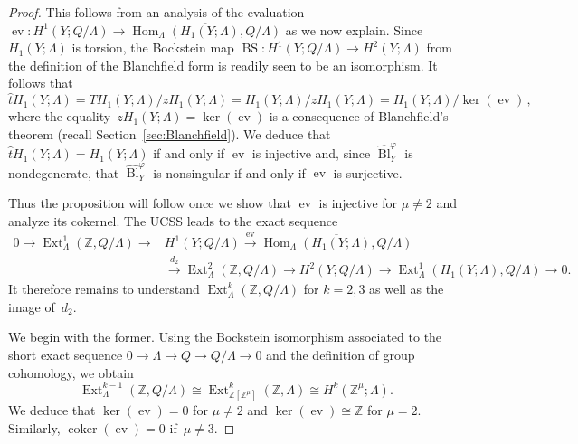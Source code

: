 \documentclass[10.9pt,a4paper]{amsart}
\theoremstyle{definition}
\theoremstyle{remark}
\newcommand{\Z}{\mathbb{Z}}
\newcommand{\Bl}{\operatorname{Bl}}
\newcommand{\ev}{\operatorname{ev}}
\newcommand{\BS}{\operatorname{BS}}
\newcommand{\coker}{\operatorname{coker}}
\newcommand{\Ext}{\operatorname{Ext}}
\newcommand{\Hom}{\operatorname{Hom}}
\begin{document}
\begin{proof}
This follows from an analysis of the evaluation~$\ev \colon H^1(Y; Q/\Lambda)\to \overline{\Hom_\Lambda(H_1(Y; \Lambda),Q/\Lambda)}$ as we now explain.
Since~$H_1(Y;\Lambda)$ is torsion, the Bockstein map $\BS \colon H^1(Y;Q/\Lambda) \to H^2(Y;\Lambda)$ from the definition of the Blanchfield form is readily seen to be an isomorphism.
It follows that 
$$\hat{t} H_1(Y;\Lambda)=TH_1(Y;\Lambda)/zH_1(Y;\Lambda)=H_1(Y;\Lambda)/zH_1(Y;\Lambda)=H_1(Y;\Lambda)/\ker(\ev)\,,$$
where the equality~$zH_1(Y;\Lambda)=\ker(\ev)$ is a consequence of Blanchfield's theorem (recall Section~\ref{sec:Blanchfield}).
We deduce that $\hat{t} H_1(Y;\Lambda)=H_1(Y;\Lambda)$ if and only if $\ev$ is injective and, since $\hat{\Bl}^{\varphi}_Y$ is nondegenerate,  that $\hat{\Bl}^{\varphi}_Y$ is nonsingular if and only if $\ev$ is surjective.

Thus the proposition will follow once we show that $\ev$ is injective for $\mu \neq 2$ and analyze its cokernel.
The UCSS leads to the exact sequence
\begin{equation}
\label{eq:UCSSPatch}
\begin{split}
0\longrightarrow \Ext^1_\Lambda(\Z, Q/\Lambda) \longrightarrow &H^1(Y; Q/\Lambda) 	\stackrel{\ev}{\longrightarrow} \overline{\Hom_\Lambda(H_1(Y;\Lambda),Q/\Lambda)} \\
	&\stackrel{d_2}{\longrightarrow} \Ext^2_\Lambda(\Z,Q/\Lambda)\longrightarrow H^2(Y;Q/\Lambda) \longrightarrow \Ext_\Lambda^1(H_1(Y;\Lambda),Q/\Lambda) \longrightarrow 0.
\end{split}
\end{equation}
It therefore remains to understand $\Ext^k_\Lambda(\Z, Q/\Lambda)$ for $k=2,3$ as well as the image of~$d_2$.

We begin with the former.
Using the Bockstein isomorphism associated to the short exact sequence $0 \to \Lambda \to Q \to Q/\Lambda \to 0$ and the definition of group cohomology, we obtain
\begin{equation*}
\Ext^{k-1}_\Lambda(\Z, Q/\Lambda)
\cong \Ext^{k}_{\Z[\Z^\mu]}(\Z,\Lambda) \cong
H^k(\Z^\mu;\Lambda).
\end{equation*}
We deduce that $\ker(\ev)=0$ for $\mu \neq 2$ and $\ker(\ev) \cong \Z$ for $\mu=2$.
Similarly,  $\coker(\ev)=0$ if~$\mu \neq 3$.



\end{proof}
\end{document}
